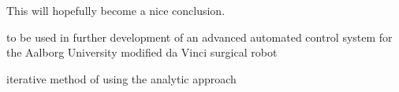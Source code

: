 This will hopefully become a nice conclusion.

to be used in further development of an advanced automated control system for the Aalborg University modified da Vinci surgical robot



iterative method of using the analytic approach